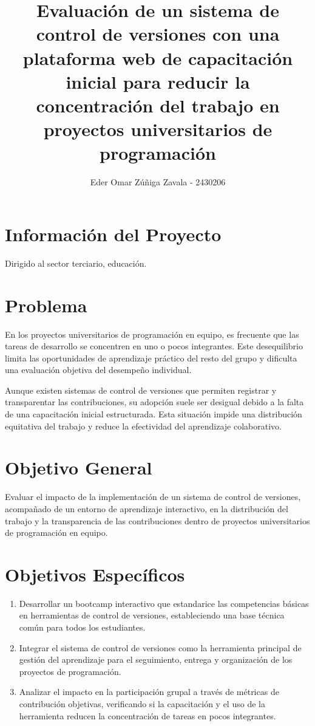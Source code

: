 \documentclass[12pt,a4paper]{article}
\title{Evaluación de un sistema de control de versiones con una plataforma web de capacitación inicial para reducir la concentración del trabajo en proyectos universitarios de programación}
\author{Eder Omar Zúñiga Zavala - 2430206}
\date{}
\begin{document}
\maketitle

\section*{Información del Proyecto}
Dirigido al sector terciario, educación.

\section{Problema}
En los proyectos universitarios de programación en equipo, es frecuente que las tareas de desarrollo se concentren en uno o pocos integrantes. Este desequilibrio limita las oportunidades de aprendizaje práctico del resto del grupo y dificulta una evaluación objetiva del desempeño individual.

Aunque existen sistemas de control de versiones que permiten registrar y transparentar las contribuciones, su adopción suele ser desigual debido a la falta de una capacitación inicial estructurada. Esta situación impide una distribución equitativa del trabajo y reduce la efectividad del aprendizaje colaborativo.

\section{Objetivo General}
Evaluar el impacto de la implementación de un sistema de control de versiones, acompañado de un entorno de aprendizaje interactivo, en la distribución del trabajo y la transparencia de las contribuciones dentro de proyectos universitarios de programación en equipo.

\section{Objetivos Específicos}
\begin{enumerate}
    \item Desarrollar un bootcamp interactivo que estandarice las competencias básicas en herramientas de control de versiones, estableciendo una base técnica común para todos los estudiantes.
    \item Integrar el sistema de control de versiones como la herramienta principal de gestión del aprendizaje para el seguimiento, entrega y organización de los proyectos de programación.
    \item Analizar el impacto en la participación grupal a través de métricas de contribución objetivas, verificando si la capacitación y el uso de la herramienta reducen la concentración de tareas en pocos integrantes.
\end{enumerate}
\end{document}
